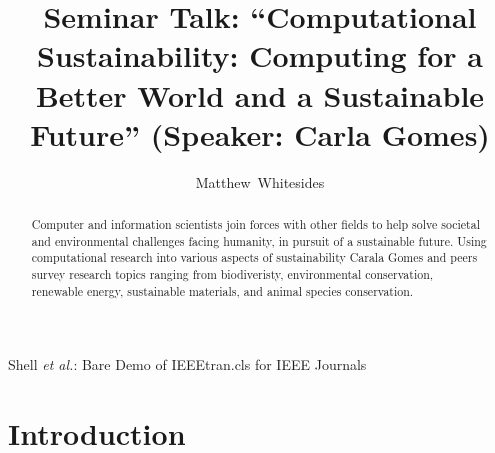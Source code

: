 \documentclass[journal,onecolumn]{IEEEtran}
\begin{document}
%
\title{Seminar Talk: ``Computational Sustainability: Computing for a Better World and a Sustainable Future'' (Speaker: Carla Gomes)}

%
%
%
\author{Matthew~Whitesides}%

%
{Shell \MakeLowercase{\textit{et al.}}: Bare Demo of IEEEtran.cls for IEEE Journals}

\maketitle 

\begin{abstract}
  Computer and information scientists join forces with other fields to help solve societal and environmental challenges facing humanity, in pursuit of a sustainable future. 
  Using computational research into various aspects of sustainability Carala Gomes and peers survey research topics ranging from biodiveristy, environmental conservation, renewable energy, sustainable materials, and animal species conservation.   
\end{abstract}


\IEEEpeerreviewmaketitle

\section{Introduction}
\end{document}
